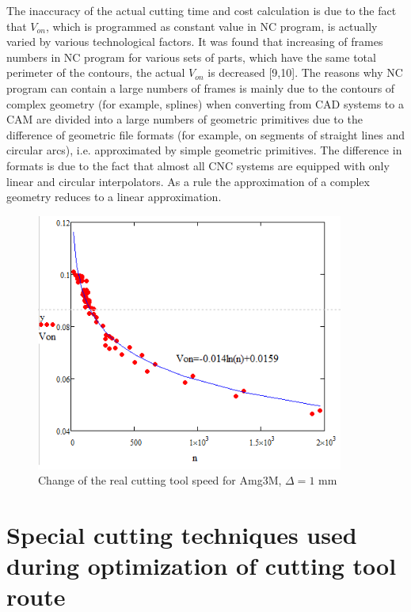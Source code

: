 \documentclass[runningheads]{llncs}
\begin{document}
The inaccuracy of the actual cutting time and cost calculation is due to the fact that $V_{on}$,
which is programmed as constant value in NC program,
is actually varied by various technological factors.
It was found that increasing of frames numbers in NC program
for various sets of parts,
which have the same total perimeter of the contours,
the actual $V_{on}$ is decreased [9,10].
The reasons why NC program can contain a large numbers of frames
is mainly due to the contours of complex geometry (for example, splines)
when converting from CAD systems to a CAM
are divided into a large numbers of geometric primitives
due to the difference of geometric file formats
(for example, on segments of straight lines and circular arcs),
i.e. approximated by simple geometric primitives.
The difference in formats is due to the fact that
almost all CNC systems are equipped with only linear and circular interpolators.
As a rule the approximation of a complex geometry reduces to a linear approximation.

\begin{figure}
  \begin{center}
  \includegraphics[width=0.9\textwidth]{plot.png}
  \caption{Change of the real cutting tool speed for Amg3M, $\Delta=1$ mm}
  \label{plot}
  \end{center}
\end{figure}


\section{Special cutting techniques used during optimization of cutting tool route}
\end{document}
